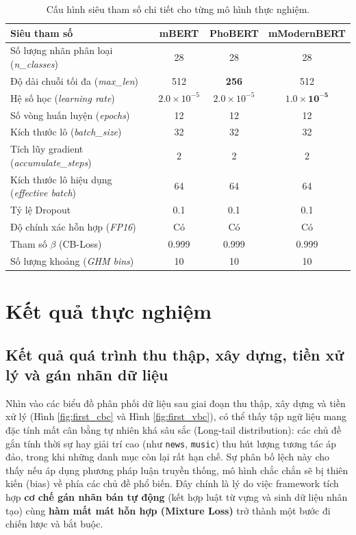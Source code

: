 \begin{table}[H]
    \centering
    \renewcommand{\arraystretch}{1.5}
    \caption{Cấu hình siêu tham số chi tiết cho từng mô hình thực nghiệm.}
    \label{tab:hyperparameters_detail}
    \begin{tabular}{|p{5.5cm}|c|c|c|}
        \hline
        \textbf{Siêu tham số} & \textbf{mBERT} & \textbf{PhoBERT} & \textbf{mModernBERT} \\
        \hline
        Số lượng nhãn phân loại (\textit{n\_classes}) & 28 & 28 & 28 \\
        \hline
        Độ dài chuỗi tối đa (\textit{max\_len}) & 512 & \textbf{256} & 512 \\
        \hline
        Hệ số học (\textit{learning rate}) & $2.0 \times 10^{-5}$ & $2.0 \times 10^{-5}$ & $\mathbf{1.0 \times 10^{-5}}$ \\
        \hline
        Số vòng huấn luyện (\textit{epochs}) & 12 & 12 & 12 \\
        \hline
        Kích thước lô (\textit{batch\_size}) & 32 & 32 & 32 \\
        \hline
        Tích lũy gradient (\textit{accumulate\_steps}) & 2 & 2 & 2 \\
        \hline
        Kích thước lô hiệu dụng (\textit{effective batch}) & 64 & 64 & 64 \\
        \hline
        Tỷ lệ Dropout & 0.1 & 0.1 & 0.1 \\
        \hline
        Độ chính xác hỗn hợp (\textit{FP16}) & Có & Có & Có \\
        \hline
        Tham số $\beta$ (CB-Loss) & 0.999 & 0.999 & 0.999 \\
        \hline
        Số lượng khoảng (\textit{GHM bins}) & 10 & 10 & 10 \\
        \hline
    \end{tabular}
\end{table}

\section{Kết quả thực nghiệm}

\subsection{Kết quả quá trình thu thập, xây dựng, tiền xử lý và gán nhãn dữ liệu}
Nhìn vào các biểu đồ phân phối dữ liệu sau giai đoạn thu thập, xây dựng và tiền xử lý (Hình \ref{fig:first_cbc} và Hình \ref{fig:first_vbc}), có thể thấy tập ngữ liệu mang đặc tính mất cân bằng tự nhiên khá sâu sắc (Long-tail distribution): các chủ đề gắn tính thời sự hay giải trí cao (như \texttt{news}, \texttt{music}) thu hút lượng tương tác áp đảo, trong khi những danh mục còn lại rất hạn chế. Sự phân bố lệch này cho thấy nếu áp dụng phương pháp luận truyền thống, mô hình chắc chắn sẽ bị thiên kiến (bias) về phía các chủ đề phổ biến. Đây chính là lý do việc framework tích hợp \textbf{cơ chế gán nhãn bán tự động} (kết hợp luật từ vựng và sinh dữ liệu nhân tạo) cùng \textbf{hàm mất mát hỗn hợp (Mixture Loss)} trở thành một bước đi chiến lược và bắt buộc.

